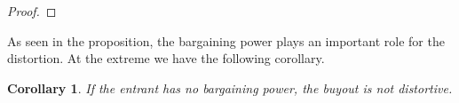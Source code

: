 \documentclass[12pt]{report}
\newtheorem{corollary}[theorem]{Corollary}
\numberwithin{equation}{section}
\begin{document}
\begin{proof}




\end{proof}
As seen in the proposition, the bargaining power plays an important role for the distortion. At the extreme we have the following corollary.  
\begin{corollary}\label{barprof}
If the entrant has no bargaining power, the buyout is not distortive. 
\end{corollary}
\end{document}
